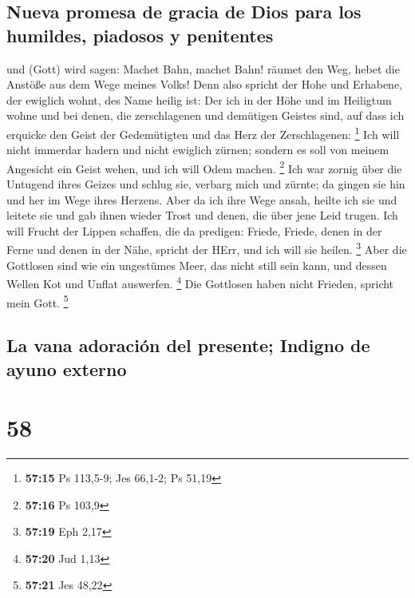 \hypertarget{nueva-promesa-de-gracia-de-dios-para-los-humildes-piadosos-y-penitentes}{%
\subsection{Nueva promesa de gracia de Dios para los humildes, piadosos
y
penitentes}\label{nueva-promesa-de-gracia-de-dios-para-los-humildes-piadosos-y-penitentes}}

 und (Gott) wird sagen: Machet Bahn, machet Bahn! räumet
den Weg, hebet die Anstöße aus dem Wege meines Volks! 
Denn also spricht der Hohe und Erhabene, der ewiglich wohnt, des Name
heilig ist: Der ich in der Höhe und im Heiligtum wohne und bei denen,
die zerschlagenen und demütigen Geistes sind, auf dass ich erquicke den
Geist der Gedemütigten und das Herz der Zerschlagenen: \footnote{\textbf{57:15}
  Ps 113,5-9; Jes 66,1-2; Ps 51,19}  Ich will nicht
immerdar hadern und nicht ewiglich zürnen; sondern es soll von meinem
Angesicht ein Geist wehen, und ich will Odem machen. \footnote{\textbf{57:16}
  Ps 103,9}  Ich war zornig über die Untugend ihres
Geizes und schlug sie, verbarg mich und zürnte; da gingen sie hin und
her im Wege ihres Herzens.  Aber da ich ihre Wege ansah,
heilte ich sie und leitete sie und gab ihnen wieder Trost und denen, die
über jene Leid trugen.  Ich will Frucht der Lippen
schaffen, die da predigen: Friede, Friede, denen in der Ferne und denen
in der Nähe, spricht der HErr, und ich will sie heilen. \footnote{\textbf{57:19}
  Eph 2,17}  Aber die Gottlosen sind wie ein ungestümes
Meer, das nicht still sein kann, und dessen Wellen Kot und Unflat
auswerfen. \footnote{\textbf{57:20} Jud 1,13}  Die
Gottlosen haben nicht Frieden, spricht mein Gott. \footnote{\textbf{57:21}
  Jes 48,22}

\hypertarget{la-vana-adoraciuxf3n-del-presente-indigno-de-ayuno-externo}{%
\subsection{La vana adoración del presente; Indigno de ayuno
externo}\label{la-vana-adoraciuxf3n-del-presente-indigno-de-ayuno-externo}}

\hypertarget{section-57}{%
\section{58}\label{section-57}}


